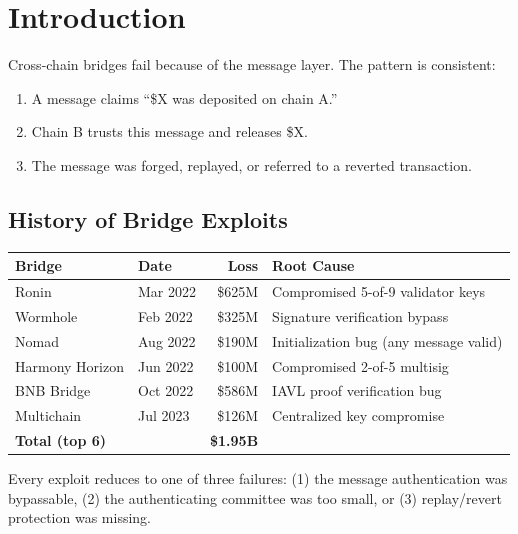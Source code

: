 \section{Introduction}


Cross-chain bridges fail because of the message layer. The pattern is consistent:

\begin{enumerate}[leftmargin=2em]
\item A message claims ``\$X was deposited on chain A.''
\item Chain B trusts this message and releases \$X.
\item The message was forged, replayed, or referred to a reverted transaction.
\end{enumerate}

\subsection{History of Bridge Exploits}

\begin{center}
\begin{tabular}{llrl}
\toprule
\textbf{Bridge} & \textbf{Date} & \textbf{Loss} & \textbf{Root Cause} \\
\midrule
Ronin & Mar 2022 & \$625M & Compromised 5-of-9 validator keys \\
Wormhole & Feb 2022 & \$325M & Signature verification bypass \\
Nomad & Aug 2022 & \$190M & Initialization bug (any message valid) \\
Harmony Horizon & Jun 2022 & \$100M & Compromised 2-of-5 multisig \\
BNB Bridge & Oct 2022 & \$586M & IAVL proof verification bug \\
Multichain & Jul 2023 & \$126M & Centralized key compromise \\
\midrule
\textbf{Total (top 6)} & & \textbf{\$1.95B} & \\
\bottomrule
\end{tabular}
\end{center}

Every exploit reduces to one of three failures: (1) the message authentication was bypassable, (2) the authenticating committee was too small, or (3) replay/revert protection was missing.

